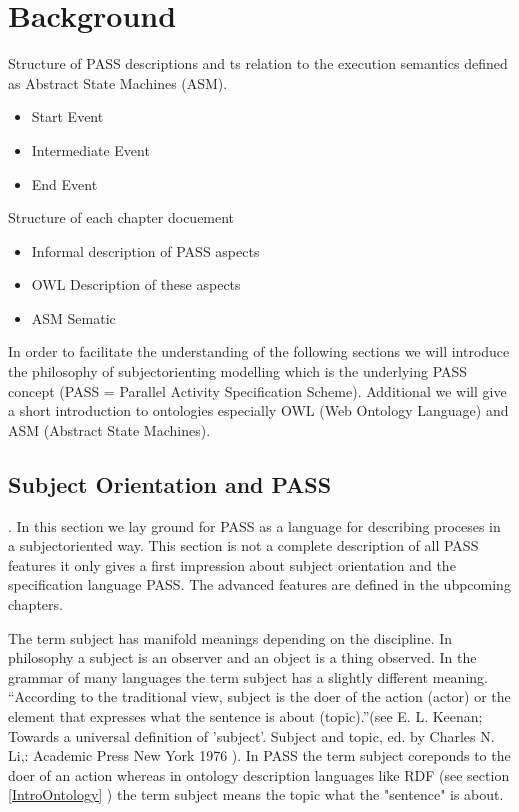 \chapter{Background}
Structure of PASS descriptions and ts relation to the execution semantics defined as Abstract State Machines (ASM).

\begin{itemize}
	\item Start Event
	\item Intermediate Event
	\item End Event
\end{itemize}


Structure of each chapter docuement
\begin{itemize}
	\item Informal description of PASS aspects
	\item OWL Description of these aspects
	\item ASM Sematic
\end{itemize}



In order to facilitate the understanding of the following sections we will introduce the philosophy of subjectorienting modelling which is the underlying PASS concept (PASS = Parallel Activity Specification Scheme). Additional we will give a short introduction to ontologies especially OWL (Web Ontology Language) and ASM (Abstract State Machines).



\section{Subject Orientation and PASS }
\label{SubjectOrient}.
In this section we lay ground for PASS as a language for describing proceses in a subjectoriented way. This section is not a complete description of all PASS features it only gives a first impression about subject orientation and the specification language PASS. The advanced features are defined in the ubpcoming chapters.

The term subject has manifold meanings depending on the discipline. In philosophy a subject is an observer and an object is a thing observed. In the grammar of many languages the term subject has a slightly different meaning. “According to the traditional view, subject is the doer of the action (actor) or the element that expresses what the sentence is about (topic).”(see E. L. Keenan; Towards a universal definition of 'subject'. Subject and topic, ed. by  Charles N. Li,: Academic Press New York 1976 ). In PASS the term subject coreponds to the doer of an action whereas in ontology description languages like RDF (see section \ref{IntroOntology} ) the term subject means the topic what the "sentence" is about.


